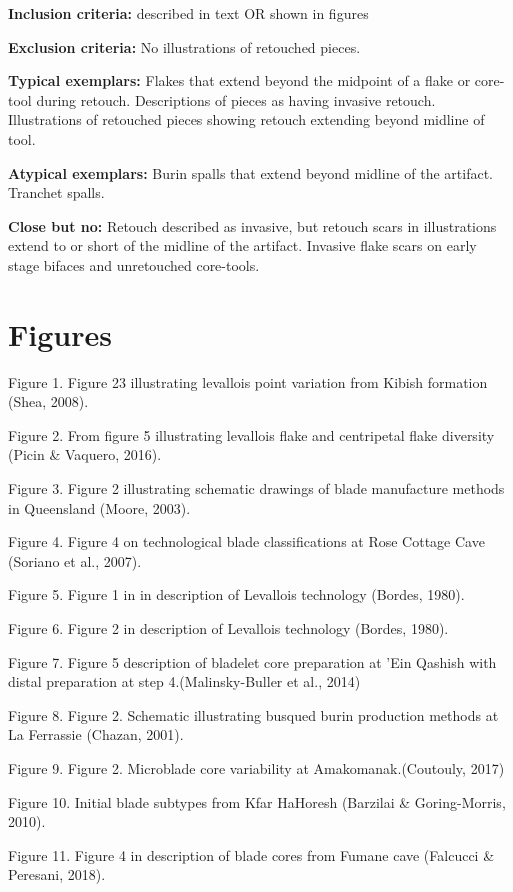\documentclass[
]{article}
\begin{document}
\textbf{Inclusion criteria:} described in text OR shown in figures

\textbf{Exclusion criteria:} No illustrations of retouched pieces.

\textbf{Typical exemplars:} Flakes that extend beyond the midpoint of a
flake or core-tool during retouch. Descriptions of pieces as having
invasive retouch. Illustrations of retouched pieces showing retouch
extending beyond midline of tool.

\textbf{Atypical exemplars:} Burin spalls that extend beyond midline of
the artifact. Tranchet spalls.

\textbf{Close but no:} Retouch described as invasive, but retouch scars
in illustrations extend to or short of the midline of the artifact.
Invasive flake scars on early stage bifaces and unretouched core-tools.

\hypertarget{figures}{%
\section{Figures}\label{figures}}

Figure 1. Figure 23 illustrating levallois point variation from Kibish
formation (Shea, 2008).

Figure 2. From figure 5 illustrating levallois flake and centripetal
flake diversity (Picin \& Vaquero, 2016).

Figure 3. Figure 2 illustrating schematic drawings of blade manufacture
methods in Queensland (Moore, 2003).

Figure 4. Figure 4 on technological blade classifications at Rose
Cottage Cave (Soriano et al., 2007).

Figure 5. Figure 1 in in description of Levallois technology (Bordes,
1980).

Figure 6. Figure 2 in description of Levallois technology (Bordes,
1980).

Figure 7. Figure 5 description of bladelet core preparation at 'Ein
Qashish with distal preparation at step 4.(Malinsky-Buller et al., 2014)

Figure 8. Figure 2. Schematic illustrating busqued burin production
methods at La Ferrassie (Chazan, 2001).

Figure 9. Figure 2. Microblade core variability at Amakomanak.(Coutouly,
2017)

Figure 10. Initial blade subtypes from Kfar HaHoresh (Barzilai \&
Goring-Morris, 2010).

Figure 11. Figure 4 in description of blade cores from Fumane cave
(Falcucci \& Peresani, 2018).
\end{document}
